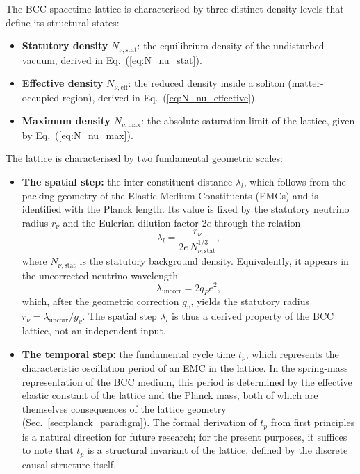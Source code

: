 \documentclass[10pt,a4paper]{article}
\begin{document}
The BCC spacetime lattice is characterised by three distinct density levels that define its structural states:
\begin{itemize}
	\item \textbf{Statutory density} \(N_{\nu,\text{stat}}\): the equilibrium density of the undisturbed vacuum, derived in Eq.~(\ref{eq:N_nu_stat}).
	\item \textbf{Effective density} \(N_{\nu,\text{eff}}\): the reduced density inside a soliton (matter-occupied region), derived in Eq.~(\ref{eq:N_nu_effective}).
	\item \textbf{Maximum density} \(N_{\nu,\text{max}}\): the absolute saturation limit of the lattice, given by Eq.~(\ref{eq:N_nu_max}).
\end{itemize}

The lattice is characterised by two fundamental geometric scales:
\begin{itemize}
	\item \textbf{The spatial step:} the inter-constituent distance \(\lambda_l\), which follows from the packing geometry of the Elastic Medium Constituents (EMCs) and is identified with the Planck length. Its value is fixed by the statutory neutrino radius \(r_\nu\) and the Eulerian dilution factor \(2e\) through the relation
	\begin{equation}
		\lambda_l = \frac{r_\nu}{2 e \, N_{\nu,\text{stat}}^{1/3}},
		\label{eq:lambda_l_from_Nnu}
	\end{equation}
	where \(N_{\nu,\text{stat}}\) is the statutory background density. Equivalently, it appears in the uncorrected neutrino wavelength
	\begin{equation}
		\lambda_{\text{uncorr}} = 2 q_P e^2,
		\label{eq:lambda_uncorr}
	\end{equation}
	which, after the geometric correction \(g_v\), yields the statutory radius \(r_\nu = \lambda_{\text{uncorr}} / g_v\). The spatial step \(\lambda_l\) is thus a derived property of the BCC lattice, not an independent input.
	
	\item \textbf{The temporal step:} the fundamental cycle time \(t_p\), which represents the characteristic oscillation period of an EMC in the lattice. In the spring-mass representation of the BCC medium, this period is determined by the effective elastic constant of the lattice and the Planck mass, both of which are themselves consequences of the lattice geometry (Sec.~\ref{sec:planck_paradigm}). The formal derivation of \(t_p\) from first principles is a natural direction for future research; for the present purposes, it suffices to note that \(t_p\) is a structural invariant of the lattice, defined by the discrete causal structure itself.
\end{itemize}
\end{document}
